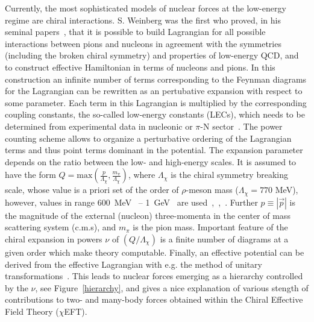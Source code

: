 
Currently, the most sophisticated models of nuclear forces at the low-energy regime are chiral interactions. S. Weinberg was the first who proved, in his seminal papers~\cite{weinberg1990nuclear, weinberg1991effective}, that it is possible to build Lagrangian for all possible interactions between pions and nucleons in agreement with the symmetries (including the broken chiral symmetry) and properties of low-energy QCD, and to construct effective Hamiltonian in terms of nucleons and pions. In this construction an infinite number of terms corresponding to the Feynman diagrams for the Lagrangian can be rewritten as an pertubative expansion with respect to some parameter. Each term in this Lagrangian is multiplied by the corresponding coupling constants, the so-called low-energy constants (LECs), which needs to be determined from experimental data in nucleonic or $\pi$-N sector~\cite{Reinert2018, epelbaum2019high}. The power counting scheme allows to organize a perturbative ordering of the Lagrangian terms and thus point terms dominant in the potential. The expansion parameter depends on the ratio between the low- and high-energy scales. It is assumed to have the form $Q = \mathrm{max}\left(\frac{p}{\Lambda_{\chi}},\frac{m_{\pi}}{\Lambda_{\chi}}\right)$, where $\Lambda_{\chi}$ is the chiral symmetry breaking scale, whose value is a priori set of the order of $\rho$-meson mass ($\Lambda_{\chi} = 770$ MeV), however, values in range 600~MeV~\cite{Epelbaum2015} -- 1~GeV~\cite{Entem2017} are used~\cite{Reinert2018},~\cite{Furnstahl2015},~\cite{epelbaum2020towards}.
Further $p \equiv |\vec{p}|$ is the magnitude of the external (nucleon) three-momenta in the center of mass scattering system (c.m.s), and $m_{\pi}$ is the pion mass. Important feature of the chiral expansion in powers $\nu$ of $\left(Q/\Lambda_{\chi}\right)$ is a finite number of diagrams at a given order which make theory computable. Finally, an effective potential can be derived from the effective Lagrangian with e.g. the method of unitary transformations~\cite{epelbaum2010nuclear, epelbaum2019high}. This leads to nuclear forces emerging as a hierarchy controlled by the $\nu$, see Figure~\ref{hierarchy}, and gives a nice explanation of various stength of contributions to two- and many-body forces obtained within the Chiral Effective Field Theory ($\chi$EFT). 
